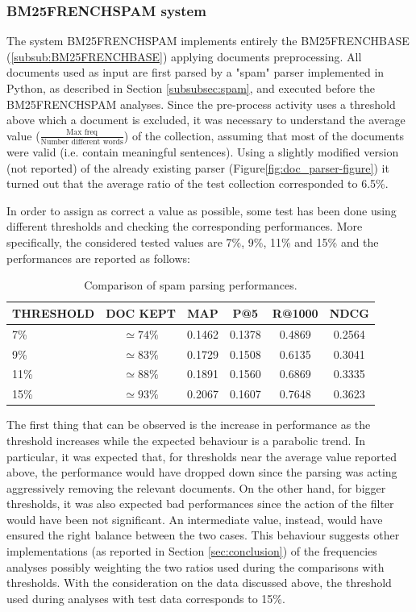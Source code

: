 \subsubsection{BM25FRENCHSPAM system}
\label{subsub:BM25FRENCHSPAM}
The system BM25FRENCHSPAM implements entirely the BM25FRENCHBASE (\ref{subsub:BM25FRENCHBASE}) applying documents preprocessing. All documents used as input are first parsed by a "spam" parser implemented in Python, as described in Section \ref{subsubsec:spam}, and executed before the BM25FRENCHSPAM analyses. Since the pre-process activity uses a threshold above which a document is excluded, it was necessary to understand the average value (\(\frac{\text{Max freq}}{\text{Number different words}}\)) of the collection, assuming that most of the documents were valid (i.e. contain meaningful sentences). Using a slightly modified version (not reported) of the already existing parser (Figure\ref{fig:doc_parser-figure}) it turned out that the average ratio of the test collection corresponded to 6.5\%. 
\par
In order to assign as correct a value as possible, some test has been done using different thresholds and checking the corresponding performances.  More specifically, the considered tested values are 7\%, 9\%, 11\% and 15\% and the performances are reported as follows:
\begin{center}
\begin{table}[h!]
\centering
\begin{tabular}{|l|c|c|c|c|c|} 
 \hline
   THRESHOLD & DOC KEPT & MAP & P@5 & R@1000 & NDCG\\
 \hline\hline
 7\% & \(\simeq 74\%\) & 0.1462 & 0.1378 & 0.4869 & 0.2564\\ 
 9\% & \(\simeq 83\%\) & 0.1729 & 0.1508 & 0.6135 & 0.3041\\
 11\% & \(\simeq 88\%\) & 0.1891 & 0.1560 & 0.6869 & 0.3335\\
 15\% & \(\simeq 93\%\) & 0.2067 & 0.1607 & 0.7648 & 0.3623\\ 
 \hline
\end{tabular}
\caption{Comparison of spam parsing performances.}
\label{tab:spamparsingperf}
\end{table}
\end{center}
The first thing that can be observed is the increase in performance as the threshold increases while the expected behaviour is a parabolic trend. In particular, it was expected that, for thresholds near the average value reported above, the performance would have dropped down since the parsing was acting aggressively removing the relevant documents. On the other hand, for bigger thresholds, it was also expected bad performances since the action of the filter would have been not significant. An intermediate value, instead, would have ensured the right balance between the two cases. This behaviour suggests other implementations (as reported in Section \ref{sec:conclusion}) of the frequencies analyses possibly weighting the two ratios used during the comparisons with thresholds. With the consideration on the data discussed above, the threshold used during analyses with test data corresponds to 15\%.    


